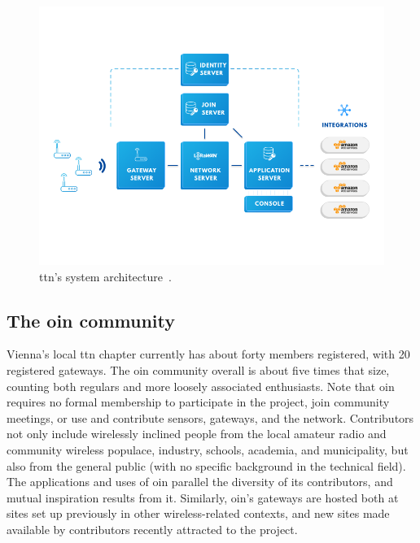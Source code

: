 \begin{figure}
  \centering
  \includegraphics[width=\columnwidth]{figures/ttn_tech_stack.png}
  \caption{\gls{ttn}'s system architecture~\cite{ttn_tech_stack}.}
  \label{fig:ttn-arch}
\end{figure}


\subsection{The \gls{oin} community}

Vienna's local \gls{ttn} chapter currently has about forty members
registered, with 20 registered gateways. The \gls{oin} community
overall is about five times that size, counting both regulars and
more loosely associated enthusiasts. Note that \gls{oin} requires
no formal membership to participate in the project, join community
meetings, or use and contribute sensors, gateways, and the network.
Contributors not only include wirelessly inclined people from the
local amateur radio and community wireless populace, industry,
schools, academia, and municipality, but also from the general
public (with no specific background in the technical field).
The applications and uses of \gls{oin} parallel the diversity
of its contributors, and mutual inspiration results from it.
Similarly, \gls{oin}'s gateways are hosted both at sites set up
previously in other wireless-related contexts, and new sites
made available by contributors recently attracted to the project.
